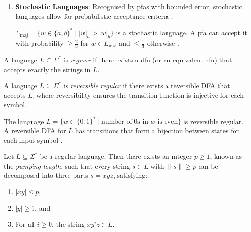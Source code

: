 \begin{enumerate}
    \item \textbf{Stochastic Languages}:  
    Recognised by \glspl{pfa} with bounded error, stochastic languages allow for probabilistic acceptance criteria \cite{rabin1963probabilistic, droste2009handbook}.  
    \begin{example}
    $L_{\text{maj}} = \{w \in \{a,b\}^* \mid |w|_a > |w|_b\}$ is a stochastic language. A \gls{pfa} can accept it with probability $\geq \frac{2}{3}$ for $w \in L_{\text{maj}}$ and $\leq \frac{1}{3}$ otherwise \cite{rabin1963probabilistic}.
    \end{example}
\end{enumerate}

\begin{definition}
A language $L \subseteq \Sigma^\ast$ is \textit{regular} if there exists a \gls{dfa} (or an equivalent \gls{nfa}) that accepts exactly the strings in $L$.
\end{definition}

\begin{definition}
    A language \( L \subseteq \Sigma^* \) is \textit{reversible regular} if there exists a reversible DFA that accepts \( L \), where reversibility ensures the transition function is injective for each symbol.
\end{definition}
    
\begin{example}
    The language \( L = \{w \in \{0,1\}^* \mid \text{number of 0s in } w \text{ is even}\} \) is reversible regular. A reversible DFA for \( L \) has transitions that form a bijection between states for each input symbol \cite{pin1997syntactic}.
\end{example}

\begin{theorem}
\label{thm:pumping-lemma}
Let $L \subseteq \Sigma^\ast$ be a regular language. Then there exists an integer $p \geq 1$, known as the \textit{pumping length}, such that every string $s \in L$ with $\|s\| \geq p$ can be decomposed into three parts $s = xyz$, satisfying:
\begin{enumerate}
    \item $|xy| \leq p$,
    \item $|y| \geq 1$, and
    \item For all $i \geq 0$, the string $xy^iz \in L$.
\end{enumerate}
\end{theorem}

